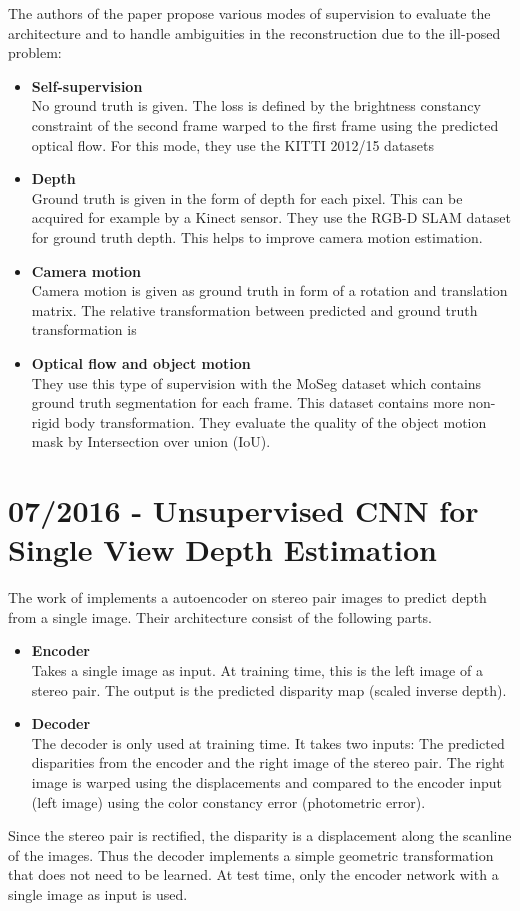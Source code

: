 		The authors of the paper propose various modes of supervision to evaluate the architecture and to handle ambiguities in the reconstruction due to the ill-posed problem:
		\begin{itemize}
		\item \textbf{Self-supervision}
			\\
			No ground truth is given.
			The loss is defined by the brightness constancy constraint of the second frame warped to the first frame using the predicted optical flow.
			For this mode, they use the {KITTI} 2012/15 datasets
		\item \textbf{Depth}
			\\
			Ground truth is given in the form of depth for each pixel.
			This can be acquired for example by a Kinect sensor.
			They use the {RGB-D SLAM} dataset for ground truth depth.
			This helps to improve camera motion estimation. 
		\item \textbf{Camera motion}
			\\
			Camera motion is given as ground truth in form of a rotation and translation matrix.
			The relative transformation between predicted and ground truth transformation is 
		\item \textbf{Optical flow and object motion}
			\\
			They use this type of supervision with the MoSeg dataset which contains ground truth segmentation for each frame.
			This dataset contains more non-rigid body transformation.
			They evaluate the quality of the object motion mask by Intersection over union (IoU).
		\end{itemize}
		
	\section{07/2016 - Unsupervised CNN for Single View Depth Estimation}
	
		The work of \cite{garg2016} implements a autoencoder on stereo pair images to predict depth from a single image.
		Their architecture consist of the following parts.
		\begin{itemize}
			\item \textbf{Encoder}
				\\
				Takes a single image as input. 
				At training time, this is the left image of a stereo pair.
				The output is the predicted disparity map (scaled inverse depth).
			\item \textbf{Decoder}
				\\
				The decoder is only used at training time.
				It takes two inputs: The predicted disparities from the encoder and the right image of the stereo pair.
				The right image is warped using the displacements and compared to the encoder input (left image) using the color constancy error (photometric error).
		\end{itemize}
		Since the stereo pair is rectified, the disparity is a displacement along the scanline of the images.
		Thus the decoder implements a simple geometric transformation that does not need to be learned.
		At test time, only the encoder network with a single image as input is used.
		
